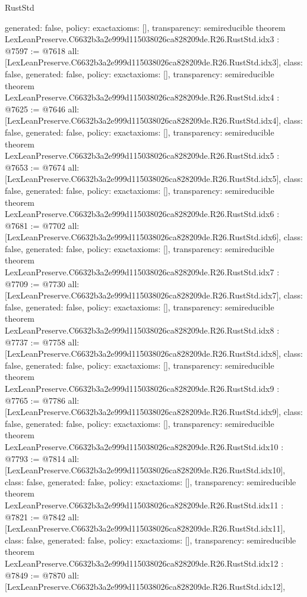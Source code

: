 \begin{lexlean}{RustStd}
\begin{coremodule}
{  generated: false,
  policy: exact{axioms: []},
  transparency: semireducible
}
theorem LexLeanPreserve.C6632b3a2e999d115038026ca828209de.R26.RustStd.idx3 : @7597 := @7618 {
  all: [LexLeanPreserve.C6632b3a2e999d115038026ca828209de.R26.RustStd.idx3],
  class: false,
  generated: false,
  policy: exact{axioms: []},
  transparency: semireducible
}
theorem LexLeanPreserve.C6632b3a2e999d115038026ca828209de.R26.RustStd.idx4 : @7625 := @7646 {
  all: [LexLeanPreserve.C6632b3a2e999d115038026ca828209de.R26.RustStd.idx4],
  class: false,
  generated: false,
  policy: exact{axioms: []},
  transparency: semireducible
}
theorem LexLeanPreserve.C6632b3a2e999d115038026ca828209de.R26.RustStd.idx5 : @7653 := @7674 {
  all: [LexLeanPreserve.C6632b3a2e999d115038026ca828209de.R26.RustStd.idx5],
  class: false,
  generated: false,
  policy: exact{axioms: []},
  transparency: semireducible
}
theorem LexLeanPreserve.C6632b3a2e999d115038026ca828209de.R26.RustStd.idx6 : @7681 := @7702 {
  all: [LexLeanPreserve.C6632b3a2e999d115038026ca828209de.R26.RustStd.idx6],
  class: false,
  generated: false,
  policy: exact{axioms: []},
  transparency: semireducible
}
theorem LexLeanPreserve.C6632b3a2e999d115038026ca828209de.R26.RustStd.idx7 : @7709 := @7730 {
  all: [LexLeanPreserve.C6632b3a2e999d115038026ca828209de.R26.RustStd.idx7],
  class: false,
  generated: false,
  policy: exact{axioms: []},
  transparency: semireducible
}
theorem LexLeanPreserve.C6632b3a2e999d115038026ca828209de.R26.RustStd.idx8 : @7737 := @7758 {
  all: [LexLeanPreserve.C6632b3a2e999d115038026ca828209de.R26.RustStd.idx8],
  class: false,
  generated: false,
  policy: exact{axioms: []},
  transparency: semireducible
}
theorem LexLeanPreserve.C6632b3a2e999d115038026ca828209de.R26.RustStd.idx9 : @7765 := @7786 {
  all: [LexLeanPreserve.C6632b3a2e999d115038026ca828209de.R26.RustStd.idx9],
  class: false,
  generated: false,
  policy: exact{axioms: []},
  transparency: semireducible
}
theorem LexLeanPreserve.C6632b3a2e999d115038026ca828209de.R26.RustStd.idx10 : @7793 := @7814 {
  all: [LexLeanPreserve.C6632b3a2e999d115038026ca828209de.R26.RustStd.idx10],
  class: false,
  generated: false,
  policy: exact{axioms: []},
  transparency: semireducible
}
theorem LexLeanPreserve.C6632b3a2e999d115038026ca828209de.R26.RustStd.idx11 : @7821 := @7842 {
  all: [LexLeanPreserve.C6632b3a2e999d115038026ca828209de.R26.RustStd.idx11],
  class: false,
  generated: false,
  policy: exact{axioms: []},
  transparency: semireducible
}
theorem LexLeanPreserve.C6632b3a2e999d115038026ca828209de.R26.RustStd.idx12 : @7849 := @7870 {
  all: [LexLeanPreserve.C6632b3a2e999d115038026ca828209de.R26.RustStd.idx12],
}
\end{coremodule}
\end{lexlean}
